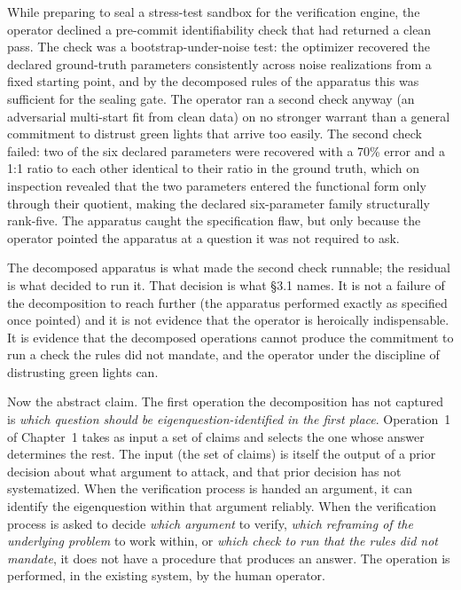 \documentclass[11pt]{article}
\begin{document}
While preparing to seal a stress-test sandbox for the verification engine, the operator declined a pre-commit identifiability check that had returned a clean pass. The check was a bootstrap-under-noise test: the optimizer recovered the declared ground-truth parameters consistently across noise realizations from a fixed starting point, and by the decomposed rules of the apparatus this was sufficient for the sealing gate. The operator ran a second check anyway (an adversarial multi-start fit from clean data) on no stronger warrant than a general commitment to distrust green lights that arrive too easily. The second check failed: two of the six declared parameters were recovered with a 70\% error and a 1:1 ratio to each other identical to their ratio in the ground truth, which on inspection revealed that the two parameters entered the functional form only through their quotient, making the declared six-parameter family structurally rank-five. The apparatus caught the specification flaw, but only because the operator pointed the apparatus at a question it was not required to ask.

The decomposed apparatus is what made the second check runnable; the residual is what decided to run it. That decision is what \S3.1 names. It is not a failure of the decomposition to reach further (the apparatus performed exactly as specified once pointed) and it is not evidence that the operator is heroically indispensable. It is evidence that the decomposed operations cannot produce the commitment to run a check the rules did not mandate, and the operator under the discipline of distrusting green lights can.

Now the abstract claim. The first operation the decomposition has not captured is \emph{which question should be eigenquestion-identified in the first place}. Operation~1 of Chapter~1 takes as input a set of claims and selects the one whose answer determines the rest. The input (the set of claims) is itself the output of a prior decision about what argument to attack, and that prior decision has not systematized. When the verification process is handed an argument, it can identify the eigenquestion within that argument reliably. When the verification process is asked to decide \emph{which argument} to verify, \emph{which reframing of the underlying problem} to work within, or \emph{which check to run that the rules did not mandate}, it does not have a procedure that produces an answer. The operation is performed, in the existing system, by the human operator.
\end{document}
